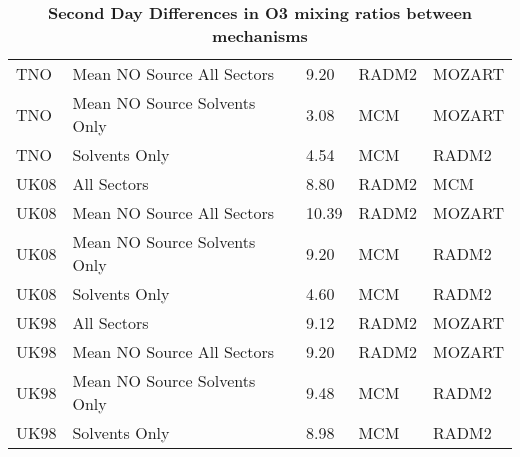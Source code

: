 \documentclass{report}
\begin{document}
\begin{table}
\begin{center}
{\begin{tabular}{lllll}
			TNO & Mean NO Source All Sectors & 9.20 & RADM2 & MOZART\\ 
			TNO & Mean NO Source Solvents Only & 3.08 & MCM & MOZART\\ 
			TNO & Solvents Only & 4.54 & MCM & RADM2\\ 
			\midrule
			UK08 & All Sectors & 8.80 & RADM2 & MCM\\ 
			UK08 & Mean NO Source All Sectors & 10.39 & RADM2 & MOZART\\ 
			UK08 & Mean NO Source Solvents Only & 9.20 & MCM & RADM2\\ 
			UK08 & Solvents Only & 4.60 & MCM & RADM2\\ 
			\midrule
			UK98 & All Sectors & 9.12 & RADM2 & MOZART\\ 
			UK98 & Mean NO Source All Sectors & 9.20 & RADM2 & MOZART\\ 
			UK98 & Mean NO Source Solvents Only & 9.48 & MCM & RADM2\\ 
			UK98 & Solvents Only & 8.98 & MCM & RADM2\\ 
			\bottomrule
		\end{tabular}}

		\caption{\textbf{Second Day Differences in O3 mixing ratios between mechanisms}}
		\end{center}
\end{table}
\end{document}
